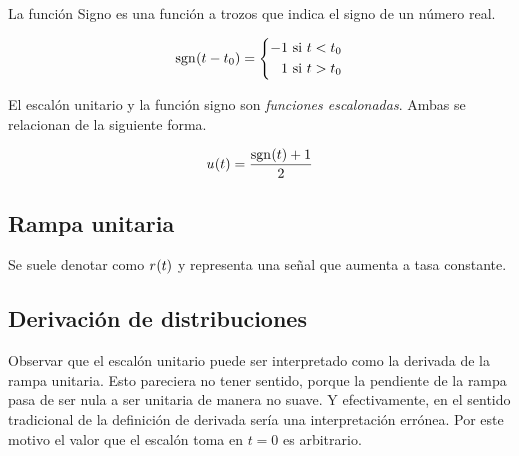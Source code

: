 La función Signo es una función a trozos que indica el signo de un número real.

\begin{mdframed}[style=DefinitionFrame]
    \begin{defn}
    \end{defn}
    \[
        \fx[\sgn]{t - t_0} =
        \left\{
        \begin{aligned}
            -1 \text{ si $t < t_0$}
            \\
            1 \text{ si $t > t_0$}
        \end{aligned}
        \right.
    \]
\end{mdframed}

\begin{center}
    \def\svgwidth{0.6\linewidth}
    
\end{center}

El escalón unitario y la función signo son \emph{funciones escalonadas}.
Ambas se relacionan de la siguiente forma.

\begin{mdframed}[style=PropertyFrame]
    \begin{prop}
    \end{prop}
    \begin{equation*}
        \fx[u]{t} = \frac{\fx[\sgn]{t} + 1}{2}
    \end{equation*}
\end{mdframed}

\subsection{Rampa unitaria}

Se suele denotar como $\fx[r]{t}$ y representa una señal que aumenta a tasa constante.

\begin{center}
    \def\svgwidth{0.6\linewidth}
    
\end{center}

\subsection{Derivación de distribuciones}

Observar que el escalón unitario puede ser interpretado como la derivada de la rampa unitaria.
Esto pareciera no tener sentido, porque la pendiente de la rampa pasa de ser nula a ser unitaria de manera no suave.
Y efectivamente, en el sentido tradicional de la definición de derivada sería una interpretación errónea.
Por este motivo el valor que el escalón toma en $t=0$ es arbitrario.

